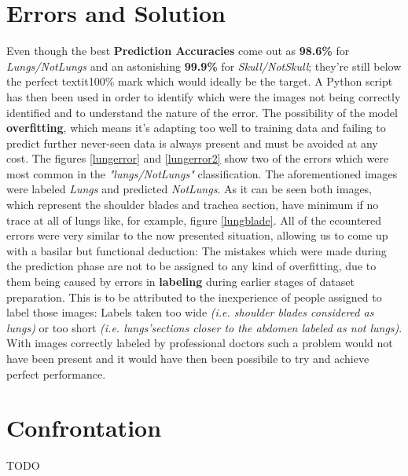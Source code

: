 \documentclass[../main.tex]{subfiles}
\begin{document}
\section{Errors and Solution}

Even though the best \textbf{Prediction Accuracies} come out as \textbf{98.6\%} for \textit{Lungs/NotLungs} and an astonishing \textbf{99.9\%} for \textit{Skull/NotSkull}; they're still below the perfect textit{100\%} mark which would ideally be the target. A Python script has then been used in order to identify which were the images not being correctly identified and to understand the nature of the error. The possibility of the model \textbf{overfitting}, which means it's adapting too well to training data and failing to predict further never-seen data\cite{overfitting} is always present and must be avoided at any cost.
The figures \ref{lungerror} and \ref{lungerror2} show two of the errors which were most common in the \textit{"lungs/NotLungs"} classification. The aforementioned images were labeled \textit{Lungs} and predicted \textit{NotLungs}. As it can be seen both images, which represent the shoulder blades and trachea section, have minimum if no trace at all of lungs like, for example, figure \ref{lungblade}. All of the ecountered errors were very similar to the now presented situation, allowing us to come up with a basilar but functional deduction: The mistakes which were made during the prediction phase are not to be assigned to any kind of overfitting, due to them being caused by errors in \textbf{labeling} during earlier stages of dataset preparation. This is to be attributed to the inexperience of people assigned to label those images: Labels taken too wide \textit{(i.e. shoulder blades considered as lungs)} or too short \textit{(i.e. lungs'sections closer to the abdomen labeled as not lungs)}. With images correctly labeled by professional doctors such a problem would not have been present and it would have then been possibile to try and achieve perfect performance.

\section{Confrontation}
TODO
\end{document}
